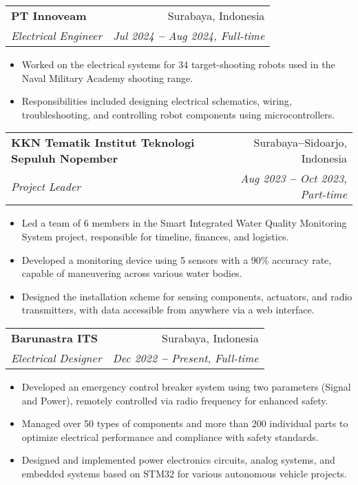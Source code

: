 \documentclass[letterpaper,11pt]{article}
\makeatletter
\newcommand{\resumeItem}[1]{
  \item\small{
    {#1 \vspace{-2pt}}
  }
}
\newcommand{\resumeSubheading}[4]{
  \vspace{-2pt}\item
    \begin{tabular*}{0.97\textwidth}[t]{l@{\extracolsep{\fill}}r}
      \textbf{#1} & #2 \\
      \textit{\small#3} & \textit{\small #4} \\
    \end{tabular*}\vspace{-7pt}
}
\newcommand{\resumeItemListStart}{\begin{itemize}}
\newcommand{\resumeItemListEnd}{\end{itemize}\vspace{-5pt}}
\makeatother
\begin{document}
    \resumeSubheading
      {PT Innoveam}{Surabaya, Indonesia}
      {Electrical Engineer}{Jul 2024 \textbf{--} Aug 2024, Full-time}
        \resumeItemListStart
            \resumeItem{Worked on the electrical systems for 34 target-shooting robots used in the Naval Military Academy shooting range.}
            \resumeItem{Responsibilities included designing electrical schematics, wiring, troubleshooting, and controlling robot components using microcontrollers.}
    \resumeItemListEnd
    \vspace{2pt}
    
    \resumeSubheading
      {KKN Tematik Institut Teknologi Sepuluh Nopember}{Surabaya\textbf{--}Sidoarjo, Indonesia}
      {Project Leader}{Aug 2023 \textbf{--} Oct 2023, Part-time}
        \resumeItemListStart
            \resumeItem{Led a team of 6 members in the Smart Integrated Water Quality Monitoring System project, responsible for timeline, finances, and logistics.}
            \resumeItem{Developed a monitoring device using 5 sensors with a 90\% accuracy rate, capable of maneuvering across various water bodies.}
            \resumeItem{Designed the installation scheme for sensing components, actuators, and radio transmitters, with data accessible from anywhere via a web interface.}
        \resumeItemListEnd


    \resumeSubheading
      {Barunastra ITS}{Surabaya, Indonesia}
      {Electrical Designer}{Dec 2022 \textbf{--} Present, Full-time}
        \resumeItemListStart
            \resumeItem{Developed an emergency control breaker system using two parameters (Signal and Power), remotely controlled via radio frequency for enhanced safety.}
            \resumeItem{Managed over 50 types of components and more than 200 individual parts to optimize electrical performance and compliance with safety standards.}
            \resumeItem{Designed and implemented power electronics circuits, analog systems, and embedded systems based on STM32 for various autonomous vehicle projects.}
        \resumeItemListEnd
\end{document}
